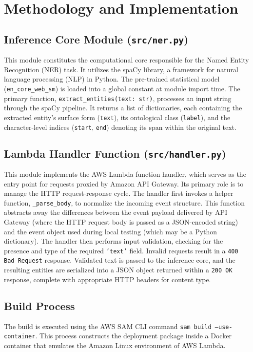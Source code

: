 \documentclass[11pt,a4paper]{article}
\begin{document}
\section{Methodology and Implementation}

\subsection{Inference Core Module (\texttt{src/ner.py})}
This module constitutes the computational core responsible for the Named Entity Recognition (NER) task. It utilizes the spaCy library, a framework for natural language processing (NLP) in Python. The pre-trained statistical model (\texttt{en\_core\_web\_sm}) is loaded into a global constant at module import time. The primary function, \texttt{extract\_entities(text: str)}, processes an input string through the spaCy pipeline. It returns a list of dictionaries, each containing the extracted entity's surface form (\texttt{text}), its ontological class (\texttt{label}), and the character-level indices (\texttt{start}, \texttt{end}) denoting its span within the original text.

\subsection{Lambda Handler Function (\texttt{src/handler.py})}
This module implements the AWS Lambda function handler, which serves as the entry point for requests proxied by Amazon API Gateway. Its primary role is to manage the HTTP request-response cycle. The handler first invokes a helper function, \texttt{\_parse\_body}, to normalize the incoming event structure. This function abstracts away the differences between the event payload delivered by API Gateway (where the HTTP request body is passed as a JSON-encoded string) and the event object used during local testing (which may be a Python dictionary). The handler then performs input validation, checking for the presence and type of the required \texttt{'text'} field. Invalid requests result in a \texttt{400 Bad Request} response. Validated text is passed to the inference core, and the resulting entities are serialized into a JSON object returned within a \texttt{200 OK} response, complete with appropriate HTTP headers for content type.

\subsection{Build Process}
The build is executed using the AWS SAM CLI command \texttt{sam build --use-container}. This process constructs the deployment package inside a Docker container that emulates the Amazon Linux environment of AWS Lambda.
\end{document}
